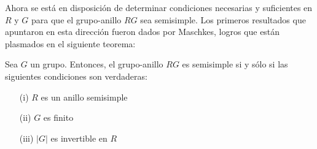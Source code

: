 Ahora se está en disposición de determinar condiciones necesarias y suficientes en $R$ y $G$ para que el grupo-anillo $RG$ sea semisimple. Los primeros resultados que apuntaron en esta dirección fueron dados por Maschkes, logros que están plasmados en el siguiente teorema:

\begin{teorema}[Maschke]
Sea $G$ un grupo. Entonces, el grupo-anillo $RG$ es semisimple si y sólo si las siguientes condiciones son verdaderas:
\begin{itemize}
\item[(i)] $R$ es un anillo semisimple
\item[(ii)] $G$ es finito
\item[(iii)] $|G|$ es invertible en $R$
\end{itemize}
\end{teorema}

